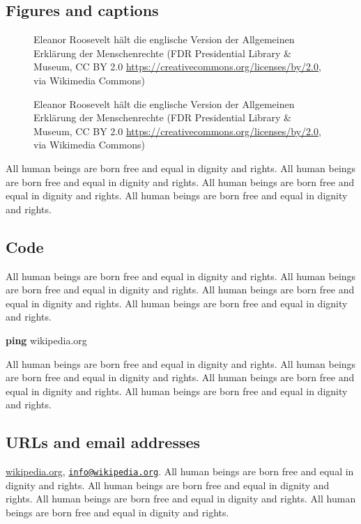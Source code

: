 \documentclass[
  ngerman,
  american,
  ]{scrartcl}
\newenvironment{Shaded}{\begin{snugshade}}{\end{snugshade}}
\newcommand{\FunctionTok}[1]{\textcolor[rgb]{0.13,0.29,0.53}{\textbf{#1}}}
\newcommand{\NormalTok}[1]{#1}
\begin{document}
\subsection{Figures and captions}\label{figures-and-captions}

\begin{figure}
\centering
{Eleanor Roosevelt hält die englische Version der Allgemeinen Erklärung
der Menschenrechte (FDR Presidential Library \& Museum, CC BY 2.0
\url{https://creativecommons.org/licenses/by/2.0}, via Wikimedia
Commons)}
\caption{Eleanor Roosevelt hält die englische Version der Allgemeinen
Erklärung der Menschenrechte (FDR Presidential Library \& Museum, CC BY
2.0 \url{https://creativecommons.org/licenses/by/2.0}, via Wikimedia
Commons)}
\end{figure}

All human beings are born free and equal in dignity and rights. All
human beings are born free and equal in dignity and rights. All human
beings are born free and equal in dignity and rights. All human beings
are born free and equal in dignity and rights.

\subsection{Code}\label{code}

All human beings are born free and equal in dignity and rights. All
human beings are born free and equal in dignity and rights. All human
beings are born free and equal in dignity and rights. All human beings
are born free and equal in dignity and rights.

\begin{Shaded}
\begin{Highlighting}[]
\FunctionTok{ping}\NormalTok{ wikipedia.org}
\end{Highlighting}
\end{Shaded}

All human beings are born free and equal in dignity and rights. All
human beings are born free and equal in dignity and rights. All human
beings are born free and equal in dignity and rights. All human beings
are born free and equal in dignity and rights.

\subsection{URLs and email addresses}\label{urls-and-email-addresses}

\href{https://www.wikipedia.org/}{wikipedia.org},
\href{mailto:info@wikipedia.org}{\nolinkurl{info@wikipedia.org}}. All
human beings are born free and equal in dignity and rights. All human
beings are born free and equal in dignity and rights. All human beings
are born free and equal in dignity and rights. All human beings are born
free and equal in dignity and rights.
\end{document}
